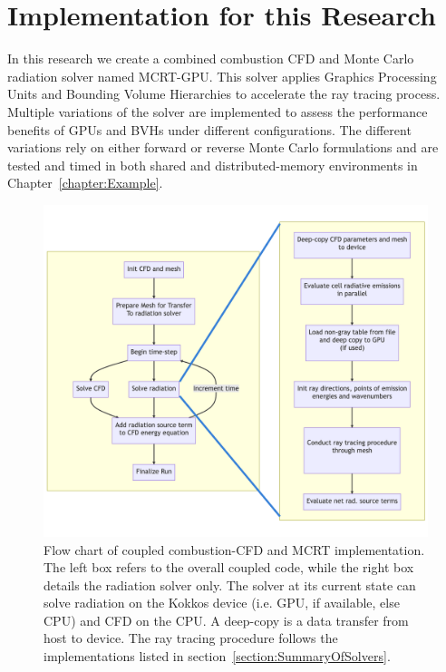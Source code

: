 \section{Implementation for this Research} \label{section:ModelForThisStudy}
In this research we create a combined combustion CFD and Monte Carlo radiation solver named MCRT-GPU. This solver applies Graphics Processing Units and Bounding Volume Hierarchies to accelerate the ray tracing process. 
Multiple variations of the solver are implemented to assess the performance benefits of GPUs and BVHs under different configurations.
The different variations rely on either forward or reverse Monte Carlo formulations and are tested and timed in both shared and distributed-memory environments in Chapter~\ref{chapter:Example}.

\begin{figure}
  \centering
  \includegraphics[width=01.0\linewidth]{figures/ch3/joint_flow_chart.png}
  \caption{Flow chart of coupled combustion-CFD and MCRT implementation. The left box refers to the overall coupled code, while the right box details the radiation solver only. The solver at its current state can solve radiation on the Kokkos device (i.e. GPU, if available, else CPU) and CFD on the CPU. A deep-copy is a data transfer from host to device. The ray tracing procedure follows the implementations listed in section~\ref{section:SummaryOfSolvers}.}
  \label{fig:joint_flow_chart}
\end{figure}

